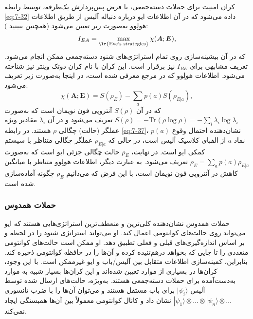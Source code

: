 کران امنیت برای حملات دسته‌جمعی، با فرض پس‌پردازش یک‌طرفه، توسط رابطه \eqref{eq:7-32} داده می‌شود که در آن اطلاعات ایو درباره دنباله آلیس از طریق اطلاعات هولِوو به‌صورت زیر تعیین می‌شود \cite{7-50} (همچنین ببینید \cite{7-46}):
\begin{equation}
	I_{EA} = \max_{\text{\lr{Eve's strategies}}} \chi(\bm{A}; \bm{E}),
	\label{eq:7-36}
\end{equation}
که در آن بیشینه‌سازی روی تمام استراتژی‌های شنود دسته‌جمعی ممکن انجام می‌شود. تعریف مشابهی برای $I_{BE}$ نیز برقرار است. این کران با نام کران دوتک-وینتر نیز شناخته می‌شود. اطلاعات هولِوو که در مرجع \cite{7-51} معرفی شده است، در اینجا به‌صورت زیر تعریف می‌شود:
\begin{equation}
	\chi(\bm{A}; \bm{E}) = S(\rho_E) - \sum_a p(a) S(\rho_{E|a}),
	\label{eq:7-37}
\end{equation}
که در آن $S(\rho)$ آنتروپی فون نویمان است که به‌صورت $S(\rho) = -\text{Tr}(\rho \log \rho) = -\sum_i \lambda_i \log \lambda_i$ تعریف می‌شود و در آن $\lambda_i$ مقادیر ویژه عملگر (حالت) چگالی $\rho$ هستند. در رابطه \eqref{eq:7-37}، $p(a)$ نشان‌دهنده احتمال وقوع نماد $a$ از الفبای کلاسیک آلیس است، در حالی که $\rho_{E|a}$ عملگر چگالی متناظر با سیستم کمکی ایو است. در نهایت، $\rho_E$ حالت چگالی جزئی ایو است که به‌صورت $\rho_E = \sum_a p(a) \rho_{E|a}$ تعریف می‌شود. به عبارت دیگر، اطلاعات هولِوو متناظر با میانگین کاهش در آنتروپی فون نویمان است، با این فرض که می‌دانیم $\rho_E$ چگونه آماده‌سازی شده است.

\subsubsection{حملات همدوس}
\label{subsec:7-4-1-3}
حملات همدوس نشان‌دهنده کلی‌ترین و منعطف‌ترین استراتژی‌هایی هستند که ایو می‌تواند روی حالت‌های کوانتومی اعمال کند. او می‌تواند استراتژی شنود را در لحظه و بر اساس اندازه‌گیری‌های قبلی و فعلی تطبیق دهد. او ممکن است حالت‌های کوانتومی متعددی را تا جایی که بخواهد درهم‌تنیده کرده و آن‌ها را در حافظه کوانتومی ذخیره کند. بنابراین، کمینه‌سازی اطلاعات متقابل بین آلیس/باب و ایو غیرممکن است. با این وجود، کران‌ها در بسیاری از موارد تعیین شده‌اند و این کران‌ها بسیار شبیه به موارد به‌دست‌آمده برای حملات دسته‌جمعی هستند. به‌ویژه، حالت‌های ارسال شده توسط آلیس $|\psi_i\rangle$ برای باب مستقل هستند و می‌توان آن‌ها را با ضرب تانسوری $|\psi_1\rangle \otimes \dots \otimes |\psi_n\rangle \otimes \dots$ نشان داد و کانال کوانتومی معمولاً بین آن‌ها همبستگی ایجاد نمی‌کند.

